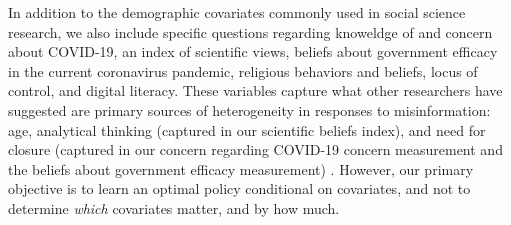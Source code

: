 \documentclass[letterpaper, 12pt, parskip=full,]{scrartcl}
\begin{document}
In addition to the demographic covariates commonly used in social science research, we also include specific questions regarding knoweldge of and concern about COVID-19, an index of scientific views, beliefs about government efficacy in the current coronavirus pandemic, religious behaviors and beliefs, locus of control, and digital literacy. These variables capture what other researchers have suggested are primary sources of heterogeneity in responses to misinformation: age, analytical thinking (captured in our scientific beliefs index), and need for closure (captured in our concern regarding COVID-19 concern measurement and the beliefs about government efficacy measurement) \citep{wittenberg2020misinformation}. However, our primary objective is to learn an optimal policy conditional on covariates, and not to determine \textit{which} covariates matter, and by how much. %




\end{document}
